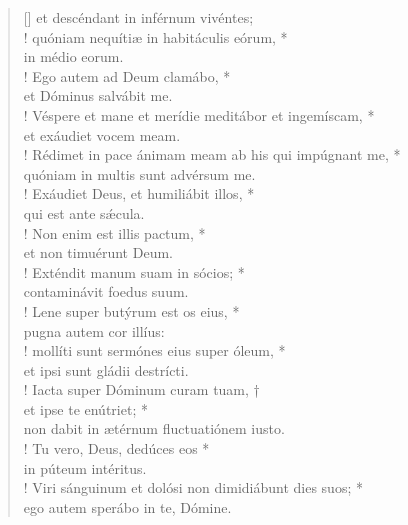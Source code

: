 \begin{verse}[\versewidth]
et descéndant in inférnum vivéntes;\\!
\vin quóniam nequítiæ in habitáculis eórum, *\\
\vin in médio eorum.\\!
Ego autem ad Deum clamábo, *\\
et Dóminus salvábit me.\\!
\vin Véspere et mane et merídie meditábor et ingemíscam, *\\
\vin et exáudiet vocem meam.\\!
Rédimet in pace ánimam meam ab his qui impúgnant me, *\\
quóniam in multis sunt advérsum me.\\!
\vin Exáudiet Deus, et humiliábit illos, *\\
\vin qui est ante s\'{æ}cula.\\!
Non enim est illis pactum, *\\
et non timuérunt Deum.\\!
\vin Exténdit manum suam in sócios; *\\
\vin contaminávit foedus suum.\\!
Lene super butýrum est os eius, *\\
pugna autem cor illíus:\\!
\vin mollíti sunt sermónes eius super óleum, *\\
\vin et ipsi sunt gládii destrícti.\\!
Iacta super Dóminum curam tuam, †\\
et ipse te enútriet; *\\
non dabit in ætérnum fluctuatiónem iusto.\\!
\vin Tu vero, Deus, dedúces eos *\\
\vin in púteum intéritus.\\!
Viri sánguinum et dolósi non dimidiábunt dies suos; *\\
ego autem sperábo in te, Dómine.\\
\end{verse}
\vspace{1cm}


